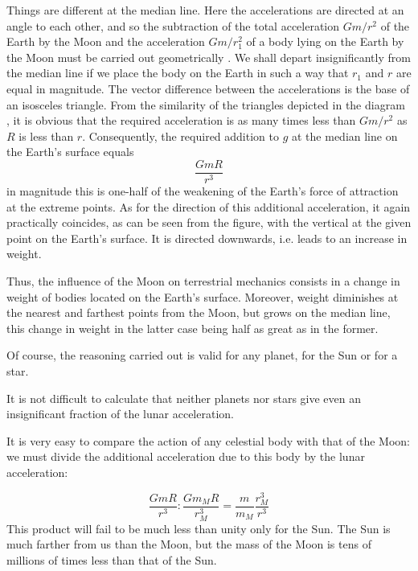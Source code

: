 Things are different at the median line. Here the accelerations are directed at an angle to each other, and so
the subtraction of the total acceleration $Gm/r^{2}$ of the
Earth by the Moon and the acceleration $Gm/r_{1}^{2}$ of a body
lying on the Earth by the Moon must be carried out
geometrically . We shall depart insignificantly from the median line if we place the body on the
Earth in such a way that $r_{1}$ and $r$ are equal in magnitude. The vector difference between the accelerations is the
base of an isosceles triangle. From the similarity of the triangles depicted in the diagram , it is obvious that the
required acceleration is as many times less than $Gm/r^{2}$ as $R$ is less than $r$. Consequently, the required addition
to $g$ at the median line on the Earth's surface equals
\begin{equation*}%
\dfrac{GmR}{r^{3}}
 \end{equation*}
in magnitude this is one-half of the weakening of the
Earth's force of attraction at the extreme points. As for
the direction of this additional acceleration, it again
practically coincides, as can be seen from the figure,
with the vertical at the given point on the Earth's surface.
It is directed downwards, i.e. leads to an increase in
weight.

Thus, the influence of the Moon on terrestrial mechanics consists in a change in weight of bodies located on
the Earth's surface. Moreover, weight diminishes at the
nearest and farthest points from the Moon, but grows
on the median line, this change in weight in the latter
case being half as great as in the former.

Of course, the reasoning carried out is valid for any planet, for the Sun or for a star.

It is not difficult to calculate that neither planets nor
stars give even an insignificant fraction of the lunar
acceleration.

It is very easy to compare the action of any celestial body with that of the Moon: we must divide the additional acceleration due to this body by the lunar acceleration:

\begin{equation*}%
\dfrac{GmR}{r^{3}} : \dfrac{Gm_{M}R}{r_{M}^{3}}  = \dfrac{m}{m_{M}}  \dfrac{r^{3}_{M}}{r^{3}} 
 \end{equation*}
This product will fail to be much less than unity only
for the Sun. The Sun is much farther from us than the
Moon, but the mass of the Moon is tens of millions of
times less than that of the Sun.

